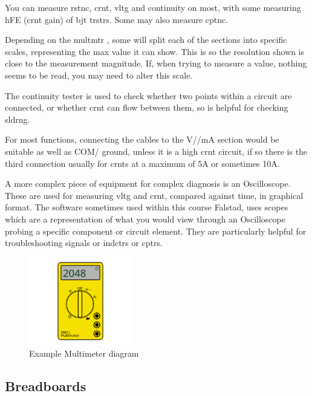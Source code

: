 \documentclass[a4paper,11pt]{report}
\begin{document}
You can measure \gls{rstnc}, \gls{crnt}, \gls{vltg} and continuity on most, with some measuring hFE (\gls{crnt} gain) of \gls{bjt} \gls{trstr}s. Some may also measure \gls{cptnc}.

Depending on the \gls{multmtr} , some will split each of the sections into specific scales, representing the max value it can show. This is so the resolution shown is close to the measurement magnitude. If, when trying to measure a value, nothing seems to be read, you may need to alter this scale.

The continuity tester is used to check whether two points within a circuit are connected, or whether \gls{crnt} can flow between them, so is helpful for checking \gls{sldrng}.

For most functions, connecting the cables to the V/\ohm/mA section would be suitable as well as COM/ ground, unless it is a high \gls{crnt} circuit, if so there is the third connection usually for \gls{crnt}s at a maximum of 5A or sometimes 10A.

A more complex piece of equipment for complex diagnosis is an Oscilloscope. These are used for measuring \gls{vltg} and \gls{crnt}, compared against time, in graphical format. The software sometimes used within this course Falstad, uses scopes which are a representation of what you would view through an Oscilloscope probing a specific component or circuit element. They are particularly helpful for troubleshooting signals or \gls{indctr}s or \gls{cptr}s.

\begin{figure}[H]
\centering
\includegraphics[width=0.4\textwidth]{multimeter1}
\caption{Example Multimeter diagram}
\end{figure}

\vspace*{1\baselineskip}

\subsection{Breadboards}
\end{document}
